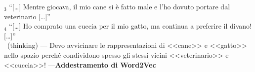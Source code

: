 \begin{frame}[t,fragile]
{{\begin{minipage}[t]{.7\textwidth}
{{			\alert{\faFile$_3$} ``[\ldots] Mentre giocava, il mio \alert{cane} si è fatto male e l'ho dovuto portare dal \alert{veterinario} [\ldots]''\\
			\alert{\faFile$_4$} ``[\ldots] Ho comprato una \alert{cuccia} per il mio \alert{gatto}, ma continua a preferire il divano! [\ldots]''\\
			\alert{\faTerminal\ (thinking)} --- Devo avvicinare le rappresentazioni di <<cane>> e <<gatto>> nello spazio perché condividono spesso gli stessi vicini <<veterinario>> e <<cuccia>>! ---}}{\textbf{Addestramento di Word2Vec}}
		\end{minipage}
		}
	}
\end{frame}
%